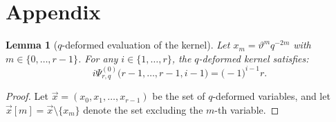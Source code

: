 \documentclass[reqno,11pt]{amsart}
\theoremstyle{plain}
\newtheorem{lemma}[theorem]{Lemma}
\theoremstyle{definition}
\theoremstyle{remark}
\numberwithin{equation}{section}
\renewcommand{\theta}{\vartheta}
\newcommand{\1}{\mathds{1}}
\newcommand{\2}{\frac{1}{2}}
\begin{document}
{				\section{Appendix}
				
				\begin{lemma}[$q$-deformed evaluation of the kernel]\label{l:Aq3_q}
					{Let $x_m = \theta^m q^{-2m}$ with $m \in \{0, \dots, r-1\}$. For any $i \in \{1, \dots, r\}$, the $q$-deformed kernel satisfies:
						\begin{equation}\label{eq:Aq3_result}
							i \Psi^{(0)}_{r,q}\big(r-1, \dots, r-1, i-1\big) = \big(-1\big)^{i-1} r.
					\end{equation}}
				\end{lemma}
				\begin{proof}
					{Let $\vec{{x}} = (x_0, x_1, \dots, x_{r-1})$ be the set of $q$-deformed  variables, and let $\vec{{x}}[m] = \vec{{x}} \setminus \{x_m\}$ denote the set excluding the $m$-th variable.} 
					

\end{proof}}
\end{document}
